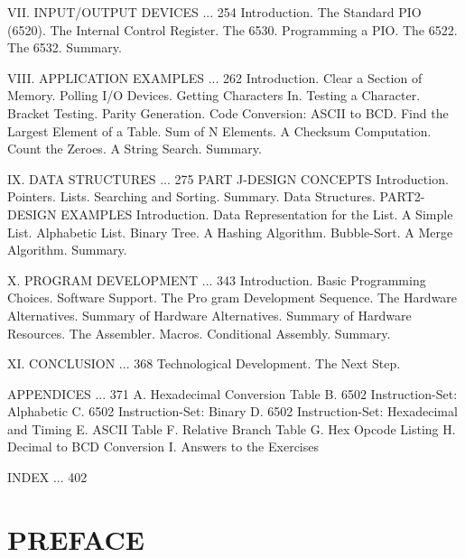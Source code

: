 \documentclass{book}
\begin{document}
VII. INPUT/OUTPUT DEVICES ... 254
Introduction. The Standard PIO (6520). The Internal Control Register. The 6530. Programming a PIO. The 6522. The 6532. Summary.

VIII. APPLICATION EXAMPLES ... 262
Introduction. Clear a Section of Memory. Polling I/O Devices. Getting Characters In. Testing a Character. Bracket Testing. Parity Generation. Code Conversion: ASCII to BCD. Find the Largest Element of a Table. Sum of N Elements. A Checksum Computation. Count the Zeroes. A String Search. Summary.

IX. DATA STRUCTURES ... 275
PART J-DESIGN CONCEPTS
Introduction. Pointers. Lists. Searching and Sorting. Summary. Data Structures.
PART2-DESIGN EXAMPLES
Introduction. Data Representation for the List. A Simple List. Alphabetic List. Binary Tree. A Hashing Algorithm. Bubble-Sort. A Merge Algorithm.
Summary.

X. PROGRAM DEVELOPMENT ... 343
Introduction. Basic Programming Choices. Software Support. The Pro gram Development Sequence. The Hardware Alternatives. Summary of Hardware Alternatives. Summary of Hardware Resources. The Assembler. Macros. Conditional Assembly. Summary.

XI. CONCLUSION ... 368
Technological Development. The Next Step.

APPENDICES ... 371
A. Hexadecimal Conversion Table
B. 6502 Instruction-Set: Alphabetic
C. 6502 Instruction-Set: Binary
D. 6502 Instruction-Set: Hexadecimal and Timing
E. ASCII Table
F. Relative Branch Table
G. Hex Opcode Listing
H. Decimal to BCD Conversion
I. Answers to the Exercises

INDEX ... 402

\section{PREFACE}
\end{document}
